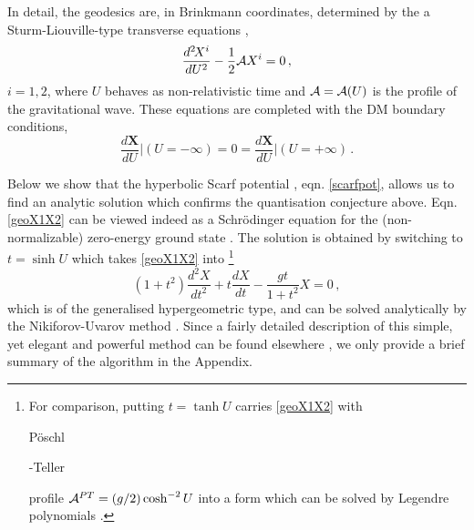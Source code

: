 \documentclass[preprint,showpacs,preprintnumbers,amsmath,amssymb,nofootinbib]{revtex4}
\newcommand{\beq}{\begin{equation}}
\newcommand{\eeq}{\end{equation}}
\newcommand{\PT}{{P\"oschl{\strut}-Teller\;}}
\newcommand{\GW}{{gravitational wave\,}}
\newcommand{\cA}{{\mathcal{A}}}
\newcommand{\bX}{{\bm{X}}}
\def\beq{\begin{equation}}
\def\eeq{\end{equation}}
\def\GW{{gravitational wave\;}}
\def\cA{{\cal A}}
\begin{document}
In detail, the geodesics  are, in Brinkmann coordinates, determined by the a Sturm-Liouville-type transverse equations \cite{DM-2},
\beq
\dfrac{d^2\!X^i}{dU^2}-\frac{1}{2}\cA X^i = 0\,,
\label{geoX1X2}
\eeq
$i=1,2$, where $U$ behaves as non-relativistic time and $\cA=\cA(U)$ is the profile of the \GW \cite{DBKP,DGH91}.
These equations are completed with the DM boundary conditions,
\beq
\frac{d\bX}{dU}\Big|(U=-\infty) = 0 = \frac{d\bX}{dU}\Big|(U=+\infty)\,.
\label{DMcond}
\eeq

 Below we show that the hyperbolic Scarf potential \cite{scarfpot,Scrf1}, eqn.  \eqref{scarfpot}, allows us to find an analytic solution which confirms the quantisation conjecture above.
Eqn.\eqref{geoX1X2} can be viewed indeed as a Schr\"odinger equation for the (non-normalizable) zero-energy ground state \cite{DM-1}.
 The solution is obtained by switching to $t=\sinh{U}$ which takes \eqref{geoX1X2} into \footnote{For comparison, putting $t=\tanh U$ carries \eqref{geoX1X2}  with \PT profile $\cA^{PT}=(g/2)\cosh^{-2}U$ into a form 
which can be solved by Legendre polynomials \cite{DM-1}.}
\begin{equation}
    (1+t^2)\frac{d^2X}{dt^2}+t\frac{dX}{dt}-\frac{gt}{1+t^2}X=0\,,
    \label{eq3}
\end{equation}
which is of the generalised hypergeometric type, and can be solved analytically by the Nikiforov-Uvarov method \cite{NikiUvar}. Since a fairly detailed description of this simple, yet elegant and powerful method can be found elsewhere \cite{NikiUvar,NU1,NU2,NU3,NU4}, we only provide a brief summary of the algorithm in the Appendix. 

\end{document}
